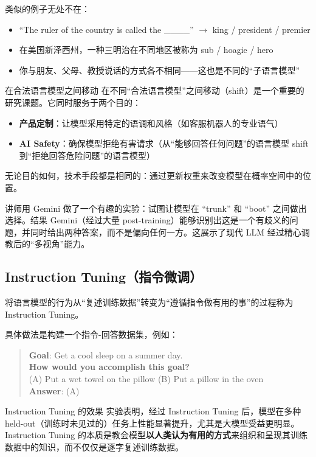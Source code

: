 \documentclass[a4paper]{article}
\begin{document}
类似的例子无处不在：
\begin{itemize}
    \item ``The ruler of the country is called the \_\_\_\_'' $\rightarrow$ king / president / premier
    \item 在美国新泽西州，一种三明治在不同地区被称为 sub / hoagie / hero
    \item 你与朋友、父母、教授说话的方式各不相同——这也是不同的``子语言模型''
\end{itemize}

\begin{knowledgebox}{在合法语言模型之间移动}
在不同``合法语言模型''之间移动（shift）是一个重要的研究课题。它同时服务于两个目的：
\begin{itemize}
    \item \textbf{产品定制}：让模型采用特定的语调和风格（如客服机器人的专业语气）
    \item \textbf{AI Safety}：确保模型拒绝有害请求（从``能够回答任何问题''的语言模型 shift 到``拒绝回答危险问题''的语言模型）
\end{itemize}
无论目的如何，技术手段都是相同的：通过更新权重来改变模型在概率空间中的位置。
\end{knowledgebox}

讲师用 Gemini 做了一个有趣的实验：试图让模型在 ``trunk'' 和 ``boot'' 之间做出选择。结果 Gemini（经过大量 post-training）能够识别出这是一个有歧义的问题，并同时给出两种答案，而不是偏向任何一方。这展示了现代 LLM 经过精心调教后的``多视角''能力。

\subsection{Instruction Tuning（指令微调）}

将语言模型的行为从``复述训练数据''转变为``遵循指令做有用的事''的过程称为 Instruction Tuning。

具体做法是构建一个指令-回答数据集，例如：

\begin{quote}
\textbf{Goal}: Get a cool sleep on a summer day. \\
\textbf{How would you accomplish this goal?} \\
(A) Put a wet towel on the pillow \quad (B) Put a pillow in the oven \\
\textbf{Answer}: (A)
\end{quote}

\begin{importantbox}{Instruction Tuning 的效果}
实验表明，经过 Instruction Tuning 后，模型在多种 held-out（训练时未见过的）任务上性能显著提升，尤其是大模型受益更明显。Instruction Tuning 的本质是教会模型\textbf{以人类认为有用的方式}来组织和呈现其训练数据中的知识，而不仅仅是逐字复述训练数据。
\end{importantbox}
\end{document}
